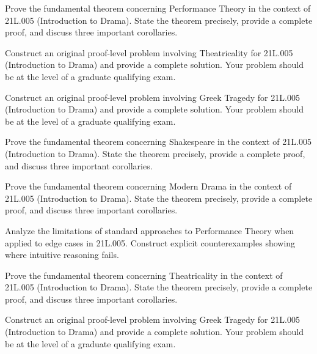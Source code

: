 \documentclass[12pt,a4paper]{exam}
\begin{document}
\begin{questions}
\vspace{0.3cm}

\question[3]
Prove the fundamental theorem concerning Performance Theory in the context of 21L.005 (Introduction to Drama). State the theorem precisely, provide a complete proof, and discuss three important corollaries.

\vspace{0.3cm}

\question[3]
Construct an original proof-level problem involving Theatricality for 21L.005 (Introduction to Drama) and provide a complete solution. Your problem should be at the level of a graduate qualifying exam.

\vspace{0.3cm}

\question[3]
Construct an original proof-level problem involving Greek Tragedy for 21L.005 (Introduction to Drama) and provide a complete solution. Your problem should be at the level of a graduate qualifying exam.

\vspace{0.3cm}

\question[3]
Prove the fundamental theorem concerning Shakespeare in the context of 21L.005 (Introduction to Drama). State the theorem precisely, provide a complete proof, and discuss three important corollaries.

\vspace{0.3cm}

\question[7]
Prove the fundamental theorem concerning Modern Drama in the context of 21L.005 (Introduction to Drama). State the theorem precisely, provide a complete proof, and discuss three important corollaries.

\vspace{0.3cm}

\question[5]
Analyze the limitations of standard approaches to Performance Theory when applied to edge cases in 21L.005. Construct explicit counterexamples showing where intuitive reasoning fails.

\vspace{0.3cm}

\question[3]
Prove the fundamental theorem concerning Theatricality in the context of 21L.005 (Introduction to Drama). State the theorem precisely, provide a complete proof, and discuss three important corollaries.

\vspace{0.3cm}

\question[5]
Construct an original proof-level problem involving Greek Tragedy for 21L.005 (Introduction to Drama) and provide a complete solution. Your problem should be at the level of a graduate qualifying exam.


\end{questions}
\end{document}
